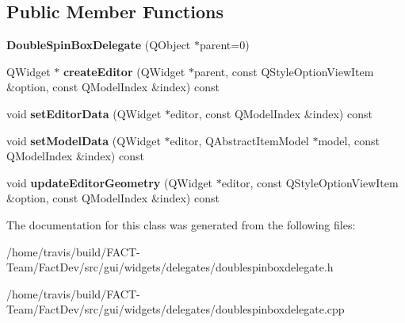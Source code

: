 \subsection*{Public Member Functions}
\begin{DoxyCompactItemize}
\item 
\hypertarget{classGui_1_1Widgets_1_1Delegates_1_1DoubleSpinBoxDelegate_a6d7df575ca17247028df99296fd2cf88}{{\bfseries Double\-Spin\-Box\-Delegate} (Q\-Object $\ast$parent=0)}\label{classGui_1_1Widgets_1_1Delegates_1_1DoubleSpinBoxDelegate_a6d7df575ca17247028df99296fd2cf88}

\item 
\hypertarget{classGui_1_1Widgets_1_1Delegates_1_1DoubleSpinBoxDelegate_a681be1ef9cc0db4e315bc2cb8f7690be}{Q\-Widget $\ast$ {\bfseries create\-Editor} (Q\-Widget $\ast$parent, const Q\-Style\-Option\-View\-Item \&option, const Q\-Model\-Index \&index) const }\label{classGui_1_1Widgets_1_1Delegates_1_1DoubleSpinBoxDelegate_a681be1ef9cc0db4e315bc2cb8f7690be}

\item 
\hypertarget{classGui_1_1Widgets_1_1Delegates_1_1DoubleSpinBoxDelegate_a60bb2e12c0b0398c74d0e8c95304d7e4}{void {\bfseries set\-Editor\-Data} (Q\-Widget $\ast$editor, const Q\-Model\-Index \&index) const }\label{classGui_1_1Widgets_1_1Delegates_1_1DoubleSpinBoxDelegate_a60bb2e12c0b0398c74d0e8c95304d7e4}

\item 
\hypertarget{classGui_1_1Widgets_1_1Delegates_1_1DoubleSpinBoxDelegate_a9c07f33b62b05f64979f52e9fead2553}{void {\bfseries set\-Model\-Data} (Q\-Widget $\ast$editor, Q\-Abstract\-Item\-Model $\ast$model, const Q\-Model\-Index \&index) const }\label{classGui_1_1Widgets_1_1Delegates_1_1DoubleSpinBoxDelegate_a9c07f33b62b05f64979f52e9fead2553}

\item 
\hypertarget{classGui_1_1Widgets_1_1Delegates_1_1DoubleSpinBoxDelegate_a6de2edfe709a762d907a47d027fb8ba9}{void {\bfseries update\-Editor\-Geometry} (Q\-Widget $\ast$editor, const Q\-Style\-Option\-View\-Item \&option, const Q\-Model\-Index \&index) const }\label{classGui_1_1Widgets_1_1Delegates_1_1DoubleSpinBoxDelegate_a6de2edfe709a762d907a47d027fb8ba9}

\end{DoxyCompactItemize}


The documentation for this class was generated from the following files\-:\begin{DoxyCompactItemize}
\item 
/home/travis/build/\-F\-A\-C\-T-\/\-Team/\-Fact\-Dev/src/gui/widgets/delegates/doublespinboxdelegate.\-h\item 
/home/travis/build/\-F\-A\-C\-T-\/\-Team/\-Fact\-Dev/src/gui/widgets/delegates/doublespinboxdelegate.\-cpp\end{DoxyCompactItemize}
